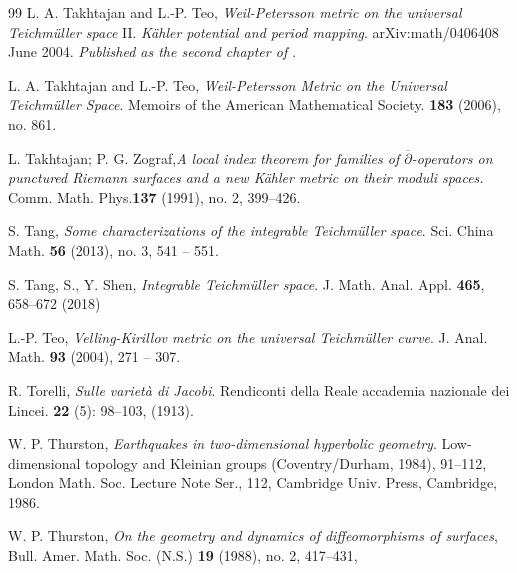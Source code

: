 \documentclass[12pt]{amsart}
\theoremstyle{plain}
\theoremstyle{definition}
\theoremstyle{remark}
\numberwithin{equation}{section} %
\numberwithin{figure}{section} %
\begin{document}
\begin{thebibliography}{99}
 L. A. Takhtajan and L.-P. Teo, {\it Weil-Petersson metric on the universal Teichm\"uller space} II. {\it K\"ahler potential and period mapping}.  	arXiv:math/0406408 June 2004.  {\it Published as the second chapter of \cite{Takhtajan_Teo_Memoirs}}.

  L. A. Takhtajan and L.-P. Teo, {\it Weil-Petersson Metric on the Universal Teichm\"uller Space}.
 Memoirs of the American Mathematical Society. {\bf 183}  (2006), no. 861.

 L. Takhtajan; P. G. Zograf,{\it A local index theorem for families of $\overline{\partial}$-operators on punctured Riemann surfaces and a new K\"ahler metric on their moduli spaces.} Comm. Math. Phys.{\bf 137} (1991), no. 2, 399–426.



 S. Tang,
 \textit{Some characterizations of the integrable Teichmüller space}.
  Sci. China Math. {\bf 56} (2013), no. 3, 541 -- 551.

S. Tang, S., Y. Shen, {\it Integrable Teichmüller space}. J. Math. Anal. Appl. {\bf 465}, 658–672 (2018)


  L.-P. Teo, {\it Velling-Kirillov metric on the universal Teichm\"uller curve}.
J. Anal. Math. {\bf 93} (2004), 271 -- 307.

 R. Torelli, {\it Sulle varietà di Jacobi}. Rendiconti della Reale accademia nazionale dei Lincei. {\bf 22} (5): 98–103, (1913).

 W. P. Thurston,
{\it Earthquakes in two-dimensional hyperbolic geometry}. Low-dimensional topology and Kleinian groups (Coventry/Durham, 1984), 91–112, London Math. Soc. Lecture Note Ser., 112, Cambridge Univ. Press, Cambridge, 1986. 

 W. P. Thurston, {\it On the geometry and dynamics of diffeomorphisms of surfaces}, Bull.
Amer. Math. Soc. (N.S.) {\bf 19} (1988), no. 2, 417–431,


\end{thebibliography}
\end{document}

